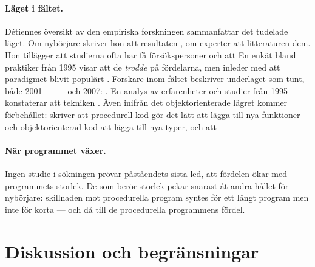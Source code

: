 \paragraph{Läget i fältet.}  Détiennes översikt av den empiriska
forskningen sammanfattar det tudelade läget.  Om nybörjare skriver hon
att resultaten , om experter att
litteraturen 
dem.  Hon
tillägger att studierna ofta har få försökspersoner och att
  En enkät bland
praktiker från 1995 visar att de \emph{trodde} på fördelarna, men
inleder med att paradigmet blivit populärt
.  Forskare inom
fältet beskriver underlaget som tunt, både 2001 ---
 --- och 2007: .  En analys av erfarenheter
och studier från 1995 konstaterar att tekniken
.
Även inifrån det objektorienterade lägret kommer förbehållet:
\textcite{Martin2008CleanCode} skriver att procedurell kod gör det lätt
att lägga till nya funktioner och objektorienterad kod att lägga till
nya typer, och att 

\paragraph{När programmet växer.}  Ingen studie i sökningen prövar
påståendets sista led, att fördelen ökar med programmets storlek.  De
som berör storlek pekar snarast åt andra hållet för nybörjare: skillnaden
mot procedurella program syntes för ett långt program men inte för korta
--- och då till de procedurella programmens
fördel\autocite{Wiedenbeck1999}.

\section{Diskussion och begränsningar}
\label{sec:und-diskussion}

